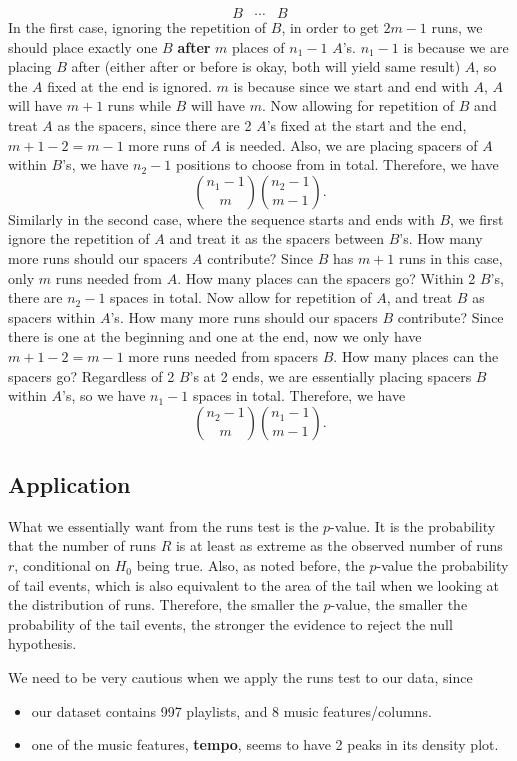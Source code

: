 \documentclass[12pt]{article}
\theoremstyle{plain}
\theoremstyle{definition}
\theoremstyle{remark}
\begin{document}
\begin{itemize}
    $$B\;\;\; \cdots \;\;\; B$$ In the first case, ignoring the repetition of $B$, in order to get $2m-1$ runs, we should place exactly one $B$ \textbf{after} $m$ places of $n_1-1$ $A$'s. $n_1-1$ is because we are placing $B$ after (either after or before is okay, both will yield same result) $A$, so the $A$ fixed at the end is ignored. $m$ is because since we start and end with $A$, $A$ will have $m+1$ runs while $B$ will have $m$. Now allowing for repetition of $B$ and treat $A$ as the spacers, since there are 2 $A$'s fixed at the start and the end, $m+1-2=m-1$ more runs of $A$ is needed. Also, we are placing spacers of $A$ within $B$'s, we have $n_2-1$ positions to choose from in total. Therefore, we have $$\binom{n_1-1}{m}\binom{n_2-1}{m-1}.$$ Similarly in the second case, where the sequence starts and ends with $B$, we first ignore the repetition of $A$ and treat it as the spacers between $B$'s. How many more runs should our spacers $A$ contribute? Since $B$ has $m+1$ runs in this case, only $m$ runs needed from $A$. How many places can the spacers go? Within 2 $B$'s, there are $n_2-1$ spaces in total. Now allow for repetition of $A$, and treat $B$ as spacers within $A$'s. How many more runs should our spacers $B$ contribute? Since there is one at the beginning and one at the end, now we only have $m+1-2=m-1$ more runs needed from spacers $B$. How many places can the spacers go? Regardless of 2 $B$'s at 2 ends, we are essentially placing spacers $B$ within $A$'s, so we have $n_1-1$ spaces in total. Therefore, we have $$\binom{n_2-1}{m} \binom{n_1-1}{m-1}.$$
\end{itemize}


\newpage
\subsection{Application}
What we essentially want from the runs test is the $p$-value. It is the probability that the number of runs $R$ is at least as extreme as the observed number of runs $r$, conditional on $H_0$ being true. Also, as noted before, the $p$-value the probability of tail events, which is also equivalent to the area of the tail when we looking at the distribution of runs. Therefore, the smaller the $p$-value, the smaller the probability of the tail events, the stronger the evidence to reject the null hypothesis.

We need to be very cautious when we apply the runs test to our data, since
\begin{itemize}
    \item our dataset contains 997 playlists, and 8 music features/columns. 
    \item one of the music features, \textbf{tempo}, seems to have 2 peaks in its density plot.
\end{itemize}
\end{document}
